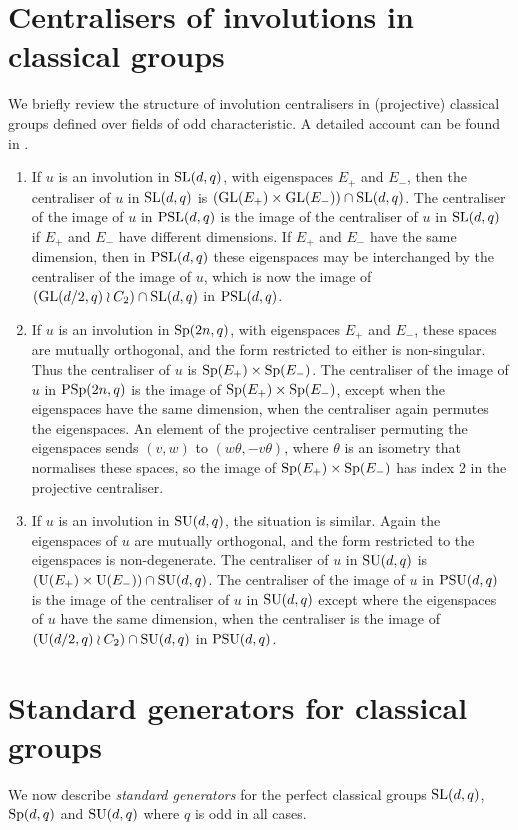 \documentclass[12pt]{article}
\def\SL{{\rm SL}}
\def\GL{{\rm GL}}
\def\U{{\rm U}}
\def\PSL{{\rm PSL}}
\def\PSp{{\rm PSp}}
\def\PSU{{\rm PSU}}
\def\Sp{{\rm Sp}}
\def\SU{{\rm SU}}
\begin{document}
\section{Centralisers of involutions in classical groups}\label{cent} 
We briefly review the structure of involution centralisers 
in (projective) classical groups 
defined over fields of odd characteristic.
A detailed account can be found in \cite[4.5.1]{GLS3}.
\begin{enumerate}
\item 
If $u$ is an involution in $\SL(d,q)$, with eigenspaces $E_+$ and
$E_-$, then the centraliser of $u$ in $\SL(d,q)$ is
$(\GL(E_+)\times\GL(E_-))\cap\SL(d,q)$. The centraliser of the
image of $u$ in $\PSL(d,q)$ is the image of the centraliser of $u$ in
$\SL(d,q)$ if $E_+$ and $E_-$ have different dimensions. If
$E_+$ and $E_-$ have the same dimension, then in $\PSL(d,q)$ these
eigenspaces may be interchanged by the centraliser of the image of
$u$, which is now the image of $(\GL(d/2,q)\wr C_2)\cap\SL(d,q)$ in
$\PSL(d,q)$.

\item 
If $u$ is an involution in $\Sp(2n,q)$, with eigenspaces $E_+$ and
$E_-$, these spaces are  mutually orthogonal, and the form restricted
to either is non-singular. Thus the centraliser of $u$ is 
$\Sp(E_+) \times \Sp(E_-)$. The centraliser of the image of $u$ in
$\PSp(2n,q)$ is the image of $\Sp(E_+)\times\Sp(E_-)$, except when the
eigenspaces have the same dimension, when the centraliser again
permutes the eigenspaces. An element of the projective
centraliser permuting the eigenspaces sends $(v,w)$ to
$(w\theta,-v\theta)$, where  $\theta$ is an isometry that normalises 
these spaces, so the image of $\Sp(E_+)\times\Sp(E_-)$ has index 2
in the projective centraliser.

\item 
If $u$ is an involution in $\SU(d,q)$, the situation is similar.
Again the eigenspaces of $u$ are mutually orthogonal, and the form
restricted to the eigenspaces is non-degenerate. The centraliser of
$u$ in $\SU(d,q)$  is $(\U(E_+)\times\U(E_-))\cap\SU(d,q)$. The
centraliser of the image of $u$ in $\PSU(d,q)$ is the image of the
centraliser of $u$ in $\SU(d,q)$  except where the eigenspaces of
$u$ have the same dimension, when the centraliser is the image of
$(\U(d/2,q)\wr C_2)\cap\SU(d,q)$ in $\PSU(d,q)$.
\end{enumerate}
\section{Standard generators for classical groups}
\label{standard}
We now describe {\it standard generators} for
the perfect classical groups $\SL(d,q)$, $\Sp(d,q)$ and $\SU(d,q)$
where $q$ is odd in all cases.
\end{document}
